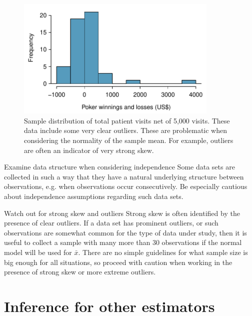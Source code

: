 \begin{figure}[ht]
   \centering
   \includegraphics[height=58mm]{ch_inference_foundations_oi_biostat/figures/pokerProfitsCanApplyNormalToSampMean/pokerProfitsCanApplyNormalToSampMean}
   \caption{Sample distribution of total patient visits net of 5,000 visits. These data include some very clear outliers. These are problematic when considering the normality of the sample mean. For example, outliers are often an indicator of very strong skew.}
   \label{pokerProfitsCanApplyNormalToSampMean}
\end{figure}

\begin{caution}
{Examine data structure when considering independence}
{Some data sets are collected in such a way that they have a natural underlying structure between observations, e.g. when observations occur consecutively. Be especially cautious about independence assumptions regarding such data sets.}
\end{caution}

\begin{caution}
{Watch out for strong skew and outliers}
{Strong skew is often identified by the presence of clear outliers. If a data set has prominent outliers, or such observations are somewhat common for the type of data under study, then it is useful to collect a sample with many more than 30 observations if the normal model will be used for $\bar{x}$. There are no simple guidelines for what sample size is big enough for all situations, so proceed with caution when working in the presence of strong skew or more extreme outliers.}
\end{caution}


\section{Inference for other estimators}
\label{aFrameworkForInference}

